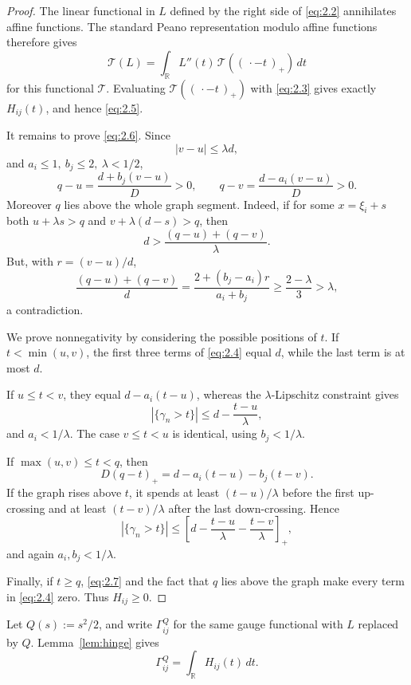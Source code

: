 \documentclass[11pt,reqno]{amsart}
\theoremstyle{definition}
\theoremstyle{remark}
\numberwithin{equation}{section}
\newcommand{\R}{\mathbb R}
\begin{document}
\begin{proof}
The linear functional in \(L\) defined by the right side of \eqref{eq:2.2}
annihilates affine functions.  The standard Peano representation modulo
affine functions therefore gives
\[
\mathcal T(L)=\int_{\R}L''(t)\,\mathcal T((\,\cdot-t\,)_+)\,dt
\]
for this functional \(\mathcal T\).  Evaluating
\(\mathcal T((\,\cdot-t\,)_+)\) with \eqref{eq:2.3} gives exactly \(H_{ij}(t)\),
and hence \eqref{eq:2.5}.

It remains to prove \eqref{eq:2.6}.  Since
\[
|v-u|\le\lambda d,
\]
and \(a_i\le1,\ b_j\le2,\ \lambda<1/2\),
\begin{equation}
q-u=\frac{d+b_j(v-u)}D>0,\qquad
q-v=\frac{d-a_i(v-u)}D>0.
\label{eq:2.7}
\end{equation}
Moreover \(q\) lies above the whole graph segment.
Indeed, if for some \(x=\xi_i+s\) both
\(u+\lambda s>q\) and \(v+\lambda(d-s)>q\), then
\[
d>\frac{(q-u)+(q-v)}{\lambda}.
\]
But, with \(r=(v-u)/d\),
\[
\frac{(q-u)+(q-v)}d
=\frac{2+(b_j-a_i)r}{a_i+b_j}
\ge\frac{2-\lambda}{3}>\lambda,
\]
a contradiction.

We prove nonnegativity by considering the possible positions of \(t\).
If \(t<\min(u,v)\), the first three terms of \eqref{eq:2.4} equal \(d\), while
the last term is at most \(d\).

If \(u\le t<v\), they equal \(d-a_i(t-u)\), whereas the
\(\lambda\)-Lipschitz constraint gives
\[
|\{\gamma_n>t\}|\le d-\frac{t-u}{\lambda},
\]
and \(a_i<1/\lambda\).  The case \(v\le t<u\) is identical, using
\(b_j<1/\lambda\).

If \(\max(u,v)\le t<q\), then
\[
D(q-t)_+=d-a_i(t-u)-b_j(t-v).
\]
If the graph rises above \(t\), it spends at least
\((t-u)/\lambda\) before the first up-crossing and at least
\((t-v)/\lambda\) after the last down-crossing.  Hence
\[
|\{\gamma_n>t\}|
\le
\left[d-\frac{t-u}{\lambda}-\frac{t-v}{\lambda}\right]_+,
\]
and again \(a_i,b_j<1/\lambda\).

Finally, if \(t\ge q\), \eqref{eq:2.7}
and the fact that \(q\) lies above the graph make every term in
\eqref{eq:2.4} zero.  Thus \(H_{ij}\ge0\).
\end{proof}

Let \(Q(s):=s^2/2\), and write \(\Gamma^Q_{ij}\) for the same gauge
functional with \(L\) replaced by \(Q\).  Lemma~\ref{lem:hinge} gives
\begin{equation}
\Gamma^Q_{ij}=\int_\R H_{ij}(t)\,dt.
\label{eq:2.8}
\end{equation}
\end{document}
